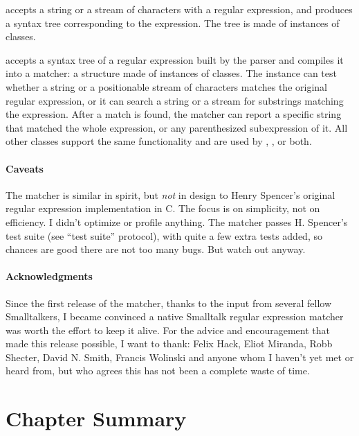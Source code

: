 \documentclass[a4paper,10pt,twoside]{book}
\begin{document}
{ accepts a string or a stream of characters with a regular expression, and produces a syntax tree corresponding to the expression. The tree is made of instances of  classes.

  accepts a syntax tree of a regular expression built by the parser and compiles it into a matcher: a structure made of instances of  classes. The  instance can test whether a string or a positionable stream of characters matches the original regular expression, or it can search a string or a stream for substrings matching the expression. After a match is found, the matcher can report a specific string that matched the whole expression, or any parenthesized subexpression of it. All other classes support the same functionality and are used by , , or both.

\paragraph{Caveats} The matcher is similar in spirit, but \emph{not} in design
to Henry Spencer's original regular expression implementation in C.  The focus is on simplicity, not on efficiency. I didn't optimize or profile anything.
The matcher passes H. Spencer's test suite (see ``test suite'' protocol), with quite a few extra tests added, so chances are good there are not too many bugs.  But watch out anyway.

\paragraph{Acknowledgments}
Since the first release of the matcher, thanks to the input from several fellow Smalltalkers, I became convinced a native Smalltalk regular expression matcher was worth the effort to keep it alive. For the advice and encouragement that made this release possible, I want to thank: Felix Hack, Eliot Miranda, Robb Shecter, David N. Smith, Francis Wolinski and anyone whom I haven't yet met or heard from, but who agrees this has not been a complete waste of time.

\section{Chapter Summary}

}
\end{document}
